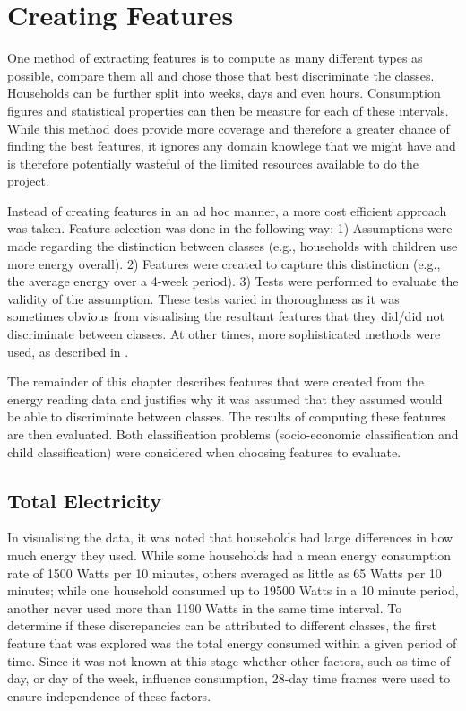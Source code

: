 \section{Creating Features}
One method of extracting features is to compute as many different types as possible, compare them all and chose those that best discriminate the classes. Households can be further split into weeks, days and even hours. Consumption figures and statistical properties can then be measure for each of these intervals. While this method does provide more coverage and therefore a greater chance of finding the best features, it ignores any domain knowlege that we might have and is therefore potentially wasteful of the limited resources available to do the project. 

Instead of creating features in an ad hoc manner, a more cost efficient approach was taken. Feature selection was done in the following way: 1) Assumptions were made regarding the distinction between classes (e.g., households with children use more energy overall). 2) Features were created to capture this distinction (e.g., the average energy over a 4-week period). 3) Tests were performed to evaluate the validity of the assumption. These tests varied in thoroughness as it was sometimes obvious from visualising the resultant features that they did/did not discriminate between classes. At other times, more sophisticated methods were used, as described in \featureSelectionSection.
\newline

The remainder of this chapter describes features that were created from the energy reading data and justifies why it was assumed that they assumed would be able to discriminate between classes. The results of computing these features are then evaluated. Both classification problems (socio-economic classification and child classification) were considered when choosing features to evaluate.

\subsection*{Total Electricity}
In visualising the data, it was noted that households had large differences in how much energy they used. While some households had a mean energy consumption rate of 1500 Watts per 10 minutes, others averaged as little as 65 Watts per 10 minutes; while one household consumed up to 19500 Watts in a 10 minute period, another never used more than 1190 Watts in the same time interval. To determine if these discrepancies can be attributed to different classes, the first feature that was explored was the total energy consumed within a given period of time. Since it was not known at this stage whether other factors, such as time of day, or day of the week, influence consumption, 28-day time frames were used to ensure independence of these factors.

